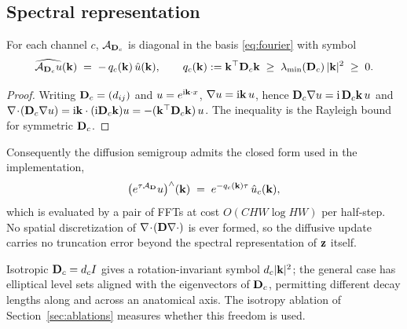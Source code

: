 \subsection*{Spectral representation}
\label{app:spectral}

\begin{lemma}
\label{lem:symbol}
For each channel $c$, $\mathcal{A}_{\mathbf{D}_c}$ is diagonal in the basis
\eqref{eq:fourier} with symbol
\begin{equation}
\widehat{\mathcal{A}_{\mathbf{D}_c} u}(\mathbf{k}) \;=\; -\,q_c(\mathbf{k})\,\hat{u}(\mathbf{k}),
\qquad
q_c(\mathbf{k}) := \mathbf{k}^\top \mathbf{D}_c \mathbf{k} \;\ge\; \lambda_{\min}(\mathbf{D}_c)\,|\mathbf{k}|^2 \;\ge\; 0 .
\label{eq:symbol}
\end{equation}
\end{lemma}

\begin{proof}
Writing $\mathbf{D}_c=(d_{ij})$ and $u = e^{\mathrm{i}\mathbf{k}\cdot x}$,
$\nabla u = \mathrm{i}\mathbf{k}\,u$, hence $\mathbf{D}_c\nabla u = \mathrm{i}\,\mathbf{D}_c\mathbf{k}\,u$
and $\nabla\!\cdot\!(\mathbf{D}_c \nabla u) = \mathrm{i}\mathbf{k} \cdot (\mathrm{i}\mathbf{D}_c\mathbf{k})u
= -(\mathbf{k}^\top \mathbf{D}_c\mathbf{k})\,u$. The inequality is the Rayleigh bound for symmetric
$\mathbf{D}_c$.
\end{proof}

Consequently the diffusion semigroup admits the closed form used in the
implementation,
\begin{equation}
\big(e^{\tau \mathcal{A}_{\mathbf{D}}}u\big)^{\wedge}(\mathbf{k}) \;=\;
  e^{-q_c(\mathbf{k})\tau}\,\hat{u}_c(\mathbf{k}),
\label{eq:semigroup}
\end{equation}
which is evaluated by a pair of FFTs at cost $O(CHW\log HW)$ per half-step. No
spatial discretization of $\nabla\!\cdot\!(\mathbf{D}\nabla\cdot)$ is ever formed, so the
diffusive update carries no truncation error beyond the spectral representation
of $\mathbf{z}$ itself.

\begin{remark}
Isotropic $\mathbf{D}_c=d_cI$ gives a rotation-invariant symbol $d_c|\mathbf{k}|^2$; the
general case has elliptical level sets aligned with the eigenvectors of $\mathbf{D}_c$,
permitting different decay lengths along and across an anatomical axis. The
isotropy ablation of Section~\ref{sec:ablations} measures whether this freedom is
used.
\end{remark}

